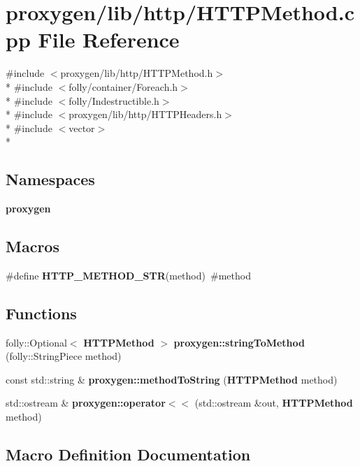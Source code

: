 \section{proxygen/lib/http/\+H\+T\+T\+P\+Method.cpp File Reference}
\label{HTTPMethod_8cpp}
{\ttfamily \#include $<$proxygen/lib/http/\+H\+T\+T\+P\+Method.\+h$>$}\\*
{\ttfamily \#include $<$folly/container/\+Foreach.\+h$>$}\\*
{\ttfamily \#include $<$folly/\+Indestructible.\+h$>$}\\*
{\ttfamily \#include $<$proxygen/lib/http/\+H\+T\+T\+P\+Headers.\+h$>$}\\*
{\ttfamily \#include $<$vector$>$}\\*
\subsection*{Namespaces}
\begin{DoxyCompactItemize}
\item 
 {\bf proxygen}
\end{DoxyCompactItemize}
\subsection*{Macros}
\begin{DoxyCompactItemize}
\item 
\#define {\bf H\+T\+T\+P\+\_\+\+M\+E\+T\+H\+O\+D\+\_\+\+S\+TR}(method)~\#method
\end{DoxyCompactItemize}
\subsection*{Functions}
\begin{DoxyCompactItemize}
\item 
folly\+::\+Optional$<$ {\bf H\+T\+T\+P\+Method} $>$ {\bf proxygen\+::string\+To\+Method} (folly\+::\+String\+Piece method)
\item 
const std\+::string \& {\bf proxygen\+::method\+To\+String} ({\bf H\+T\+T\+P\+Method} method)
\item 
std\+::ostream \& {\bf proxygen\+::operator$<$$<$} (std\+::ostream \&out, {\bf H\+T\+T\+P\+Method} method)
\end{DoxyCompactItemize}


\subsection{Macro Definition Documentation}
